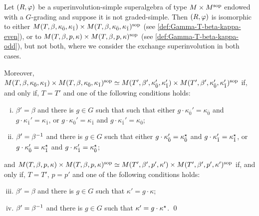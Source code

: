 \begin{thm}\label{thm:MxM-type-I}
    Let $(R, \varphi)$ be a superinvolution-simple superalgebra of type $M\times M^{\mathrm{sop}}$ endowed with a $G$-grading and suppose it is not graded-simple. 
    Then $(R, \varphi)$ is isomorphic to either $M(T, \beta, \kappa_{\bar{0}}, \kappa_{\bar{1}}) \times M(T, \beta, \kappa_{\bar{0}}, \kappa_{\bar{1}})^{\mathrm{sop}}$ (see \cref{def:Gamma-T-beta-kappa-even}), or to $M (T, \beta, p, \kappa) \times M (T, \beta, p, \kappa)^{\mathrm{sop}}$ (see \cref{def:Gamma-T-beta-kappa-odd}), but not both, where we consider the exchange superinvolution in both cases. 
    
    \noindent
    Moreover, $M(T, \beta, \kappa_{\bar{0}}, \kappa_{\bar{1}}) \times M(T, \beta, \kappa_{\bar{0}}, \kappa_{\bar{1}})^{\mathrm{sop}} \simeq M(T', \beta', \kappa_{\bar{0}}', \kappa_{\bar{1}}') \times M(T', \beta', \kappa_{\bar{0}}', \kappa_{\bar{1}}')^{\mathrm{sop}}$ if, and only if, $T = T'$ and one of the following conditions holds:
	\begin{enumerate}[(i)]
	    \item $\beta'=\beta$ and there is $g\in G$ such that such that either $g \cdot \kappa_{\bar 0}'=\kappa_{\bar 0}$ and $g \cdot \kappa_{\bar 1}'=\kappa_{\bar 1}$, or $g \cdot \kappa_{\bar 0}'=\kappa_{\bar 1}$ and $g \cdot \kappa_{\bar 1}'=\kappa_{\bar 0}$; 
	    \item $\beta'=\beta^{-1}$ and there is $g\in G$ such that either $g \cdot \kappa_{\bar 0}'=\kappa_{\bar 0}^\star$ and $g \cdot \kappa_{\bar 1}'=\kappa_{\bar 1}^\star$, or $g \cdot \kappa_{\bar 0}'=\kappa_{\bar 1}^\star$ and $g \cdot \kappa_{\bar 1}'=\kappa_{\bar 0}^\star$;
	\end{enumerate}
    and $M (T, \beta, p, \kappa) \times M (T, \beta, p, \kappa)^{\mathrm{sop}} \simeq M (T', \beta', p', \kappa') \times M (T', \beta', p', \kappa')^{\mathrm{sop}}$ if, and only if, $T = T'$, $p=p'$ and one of the following conditions holds:
    \begin{enumerate}[(i)]
        \setcounter{enumi}{2}
	    \item $\beta'=\beta$ and there is $g\in G$ such that $\kappa' = g \cdot \kappa$;
	    \item $\beta'=\beta^{-1}$ and there is $g\in G$ such that $\kappa' = g \cdot \kappa^\star$. \qed
	\end{enumerate}
\end{thm}

